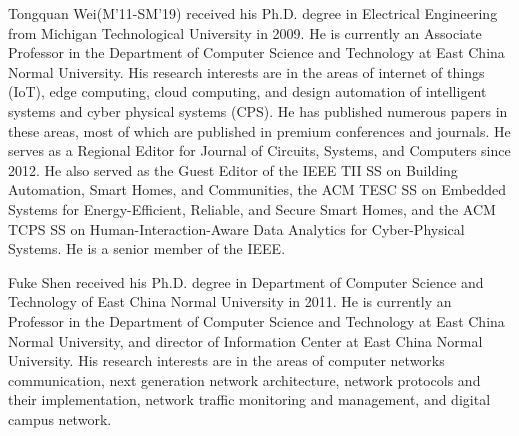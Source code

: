 \documentclass{ieeeaccess}
\theoremstyle{definition}
\begin{document}
\begin{IEEEbiography}{Tongquan Wei(M'11-SM'19)}
    received his Ph.D. degree in Electrical Engineering from Michigan Technological University in 2009. He is currently an Associate Professor in the Department of Computer Science and Technology at East China Normal University. His research interests are in the areas of internet of things (IoT), edge computing, cloud computing, and design automation of intelligent systems and cyber physical systems (CPS). He has published numerous papers in these areas, most of which are published in premium conferences and journals. He serves as a Regional Editor for Journal of Circuits, Systems, and Computers since 2012. He also served as the Guest Editor of the IEEE TII SS on Building Automation, Smart Homes, and Communities, the ACM TESC SS on Embedded Systems for Energy-Efficient, Reliable, and Secure Smart Homes, and the ACM TCPS SS on Human-Interaction-Aware Data Analytics for Cyber-Physical Systems. He is a senior member of the IEEE.
\end{IEEEbiography}

\begin{IEEEbiography}{Fuke Shen}
    received his Ph.D. degree in Department of Computer Science and Technology of East China Normal University in 2011. He is currently an Professor in the Department of Computer Science and Technology at East China Normal University, and director of Information Center at East China Normal University. His research interests are in the areas of computer networks communication, next generation network architecture, network protocols and their implementation, network traffic monitoring and management, and digital campus network.
\end{IEEEbiography}

\EOD
\end{document}
